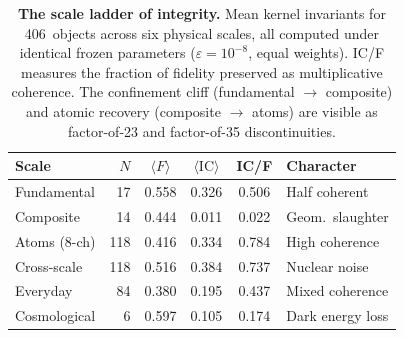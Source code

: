 \documentclass[11pt]{article}
\newcommand{\eps}{\varepsilon}
\newcommand{\IC}{\mathrm{IC}}
\begin{document}
\begin{table}[!htbp]
\caption{\textbf{The scale ladder of integrity.} Mean kernel
invariants for 406~objects across six physical scales, all computed
under identical frozen parameters
($\eps = 10^{-8}$, equal weights). IC/F measures the fraction of
fidelity preserved as multiplicative coherence. The confinement cliff
(fundamental $\to$ composite) and atomic recovery (composite $\to$
atoms) are visible as factor-of-23 and factor-of-35 discontinuities.}
\label{tab:scales}
\begin{tabular}{lrcccl}
\toprule
\textbf{Scale} & $N$ & $\langle F\rangle$ & $\langle\IC\rangle$
  & IC/F & \textbf{Character} \\
\midrule
Fundamental   &  17 & 0.558 & 0.326 & 0.506 & Half coherent \\
Composite     &  14 & 0.444 & 0.011 & 0.022 & \textcolor{CliffRed}{Geom.\ slaughter} \\
Atoms (8-ch)  & 118 & 0.416 & 0.334 & 0.784 & \textcolor{HealGreen}{High coherence} \\
Cross-scale   & 118 & 0.516 & 0.384 & 0.737 & Nuclear noise \\
Everyday      &  84 & 0.380 & 0.195 & 0.437 & Mixed coherence \\
Cosmological  &   6 & 0.597 & 0.105 & 0.174 & Dark energy loss \\
\bottomrule
\end{tabular}
\end{table}
\end{document}
